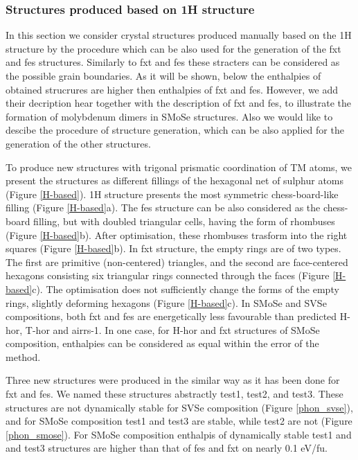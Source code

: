 \documentclass[a4paperm]{article}
\begin{document}
\subsubsection{Structures produced based on 1H structure}

In this section we consider crystal structures produced manually based on the 1H structure by the procedure which can be also used for the generation of the fxt and fes structures.
Similarly to fxt and fes these stracters can be considered as the possible grain boundaries.
As it will be shown, below the enthalpies of obtained strucrures are higher then enthalpies of fxt and fes.
However, we add their decription hear together with the description of fxt and fes, to illustrate the formation of molybdenum dimers in SMoSe structures.
Also we would like to descibe the procedure of structure generation, which can be also applied for the generation of the other structures.

To produce new structures with trigonal prismatic coordination of TM atoms, we present the structures as different fillings of the hexagonal net of sulphur atoms (Figure \ref{H-based}).
1H structure presents the most symmetric chess-board-like filling (Figure \ref{H-based}a).
The fes structure can be also considered as the chess-board filling, but with doubled triangular cells, having the form of rhombuses (Figure \ref{H-based}b).
After optimisation, these rhombuses trasform into the right squares (Figure \ref{H-based}b).
In fxt structure, the empty rings are of two types.
The first are primitive (non-centered) triangles, and the second are face-centered hexagons consisting six triangular rings connected through the faces (Figure \ref{H-based}c).
The optimisation does not sufficiently change the forms of the empty rings, slightly deforming hexagons (Figure \ref{H-based}c).
In SMoSe and SVSe compositions, both fxt and fes are energetically less favourable than predicted H-hor, T-hor and airrs-1.
In one case, for H-hor and fxt structures of SMoSe composition, enthalpies can be considered as equal within the error of the method.

Three new structures were produced in the similar way as it has been done for fxt and fes.
We named these structures abstractly test1, test2, and test3.
These structures are not dynamically stable for SVSe composition (Figure \ref{phon_svse}), and for SMoSe composition test1 and test3 are stable, while test2 are not (Figure \ref{phon_smose}).
For SMoSe composition enthalpis of dynamically stable test1 and and test3 structures are higher than that of  fes and fxt on nearly 0.1 eV/fu.
\end{document}
